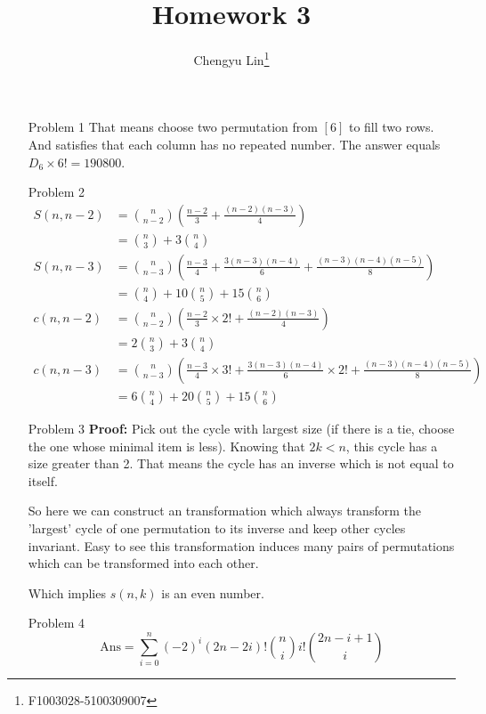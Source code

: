 \documentclass{article}
\title{Homework 3}
\author{Chengyu Lin\footnote{F1003028-5100309007}}
\date{}
\begin{document}
\maketitle

\begin{itemize}
    \item[Problem 1]
        That means choose two permutation from $[6]$ to fill two rows.
        And satisfies that each column has no repeated number.
        The answer equals $D_6 \times 6! = 190800$.

    \item[Problem 2]
        \begin{align*}
            S(n, n-2) &= {n \choose n-2} (\frac{n-2}{3} + \frac{(n-2)(n-3)}{4}) \\
                      &= {n \choose 3} + 3 {n \choose 4} \\
            S(n, n-3) &= {n \choose n-3} (\frac{n-3}{4} + \frac{3(n-3)(n-4)}{6} + \frac{(n-3)(n-4)(n-5)}{8}) \\
                      &= {n \choose 4} + 10{n \choose 5} + 15{n \choose 6} \\
            c(n, n-2) &= {n \choose n-2} (\frac{n-2}{3} \times 2! + \frac{(n-2)(n-3)}{4}) \\
                      &= 2 {n \choose 3} + 3 {n \choose 4} \\
            c(n, n-3) &= {n \choose n-3} (\frac{n-3}{4} \times 3! + \frac{3(n-3)(n-4)}{6} \times 2! + \frac{(n-3)(n-4)(n-5)}{8}) \\
                      &= 6 {n \choose 4} + 20{n \choose 5} + 15{n \choose 6}
        \end{align*}

    \item[Problem 3]
        \textbf{Proof: } Pick out the cycle with largest size (if there is a tie, choose the one
        whose minimal item is less). Knowing that $2k < n$, this cycle has a size greater than 2.
        That means the cycle has an inverse which is not equal to itself.

        So here we can construct an transformation which always transform the 'largest' cycle of
        one permutation to its inverse and keep other cycles invariant. Easy to see this transformation
        induces many pairs of permutations which can be transformed into each other.

        Which implies $s(n, k)$ is an even number.

    \item[Problem 4]
        $$\text{Ans} = \sum_{i=0}^{n}(-2)^i (2n - 2i)! {n \choose i} i! {2n - i + 1 \choose i}$$


\end{itemize}
\end{document}
